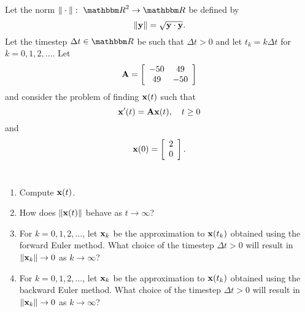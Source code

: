 
Let the norm $\norm{\cdot}:\mbox{ }\R^2\rightarrow\R$ be defined by
\[
\|{\bf y}\| = \sqrt{{\bf y}\cdot {\bf y}}.
\]
Let the timestep $\Delta t\in\R$ be such that $\Delta t>0$ and let $t_k=k\Delta t$ for $k=0,1,2,\ldots$. Let
\[
{\bf A} = \left[\begin{array}{cc}-50 & 49 \cr 49 & -50\end{array}\right]
\]
and consider the problem of finding ${\bf x}(t)$ such that
\[
{\bf x}'(t) = {\bf A}{\bf x}(t),\quad t\ge 0
\]
and
\[
{\bf x}(0) = \left[\begin{array}{c}2 \\ 0\end{array}\right].
\]
\\
\begin{enumerate}
\item Compute ${\bf x}(t)$.
\\
\item How does $\|{\bf x}(t)\|$ behave as $t\to\infty$?
\\
\item For $k=0,1,2,\ldots$, let ${\bf x}_k$ be the approximation to ${\bf x}(t_k)$ obtained using the forward Euler method. What choice of the timestep $\Delta t>0$ will result in $\|{\bf x}_k\|\rightarrow 0$ as $k\rightarrow\infty$?
\\
\item For $k=0,1,2,\ldots$, let ${\bf x}_k$ be the approximation to ${\bf x}(t_k)$ obtained using the backward Euler method. What choice of the timestep $\Delta t>0$ will result in $\|{\bf x}_k\|\rightarrow 0$ as $k\rightarrow\infty$?
\end{enumerate}



